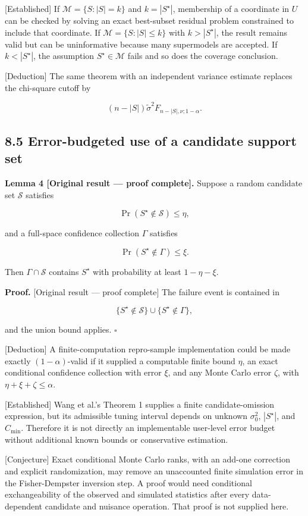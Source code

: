 \documentclass[
  english,
  11pt,
  a4paper,
]{article}
\begin{document}
{[}Established{]} If $\mathcal M=\{S:|S|=k\}$ and $k=|S^\star|$,
membership of a coordinate in $U$ can be checked by solving an exact
best-subset residual problem constrained to include that coordinate. If
$\mathcal M=\{S:|S|\le k\}$ with $k>|S^\star|$, the result remains
valid but can be uninformative because many supermodels are accepted. If
$k<|S^\star|$, the assumption $S^\star\in\mathcal M$ fails and so
does the coverage conclusion.

{[}Deduction{]} The same theorem with an independent variance estimate
replaces the chi-square cutoff by

$$
(n-|S|)\widetilde\sigma^2F_{n-|S|,\nu;1-\alpha}.
$$

\subsection{8.5 Error-budgeted use of a candidate support
set}\label{error-budgeted-use-of-a-candidate-support-set}

\textbf{Lemma 4 {[}Original result --- proof complete{]}.} Suppose a
random candidate set $\mathcal S$ satisfies

$$
\Pr(S^\star\notin\mathcal S)\le\eta,
$$

and a full-space confidence collection $\Gamma$ satisfies

$$
\Pr(S^\star\notin\Gamma)\le\xi.
$$

Then $\Gamma\cap\mathcal S$ contains $S^\star$ with probability at
least $1-\eta-\xi$.

\textbf{Proof.} {[}Original result --- proof complete{]} The failure
event is contained in

$$
\{S^\star\notin\mathcal S\}\cup\{S^\star\notin\Gamma\},
$$

and the union bound applies. $\square$

{[}Deduction{]} A finite-computation repro-sample implementation could
be made exactly $(1-\alpha)$-valid if it supplied a computable finite
bound $\eta$, an exact conditional confidence collection with error
$\xi$, and any Monte Carlo error $\zeta$, with
$\eta+\xi+\zeta\le\alpha$.

{[}Established{]} Wang et al.'s Theorem 1 supplies a finite
candidate-omission expression, but its admissible tuning interval
depends on unknown $\sigma_0^2$, $|S^\star|$, and $C_{\min}$.
Therefore it is not directly an implementable user-level error budget
without additional known bounds or conservative estimation.

{[}Conjecture{]} Exact conditional Monte Carlo ranks, with an add-one
correction and explicit randomization, may remove an unaccounted finite
simulation error in the Fisher-Dempster inversion step. A proof would
need conditional exchangeability of the observed and simulated
statistics after every data-dependent candidate and nuisance operation.
That proof is not supplied here.
\end{document}
